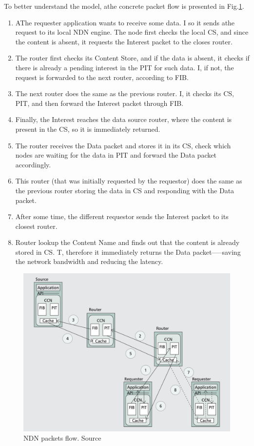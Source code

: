 To better understand the model, athe concrete packet flow is presented in Fig.\ref{fig:ndn-flow}. 
\begin{enumerate}
    \item AThe requester application wants to receive some data. I so it sends athe request to its local NDN engine. The node first checks the local CS, and since the content is absent, it requests the Interest packet to the closes router.
    \item The router first checks its Content Store, and if the data is absent, it checks if there is already a pending interest in the PIT for such data. I, if not, the request is forwarded to the next router, according to FIB.  
    \item The next router does the same as the previous router. I, it checks its CS, PIT, and then forward the Interest packet through FIB.
    \item Finally, the Interest reaches the data source router, where the content is present in the CS, so it is immediately returned.
    \item The router receives the Data packet and stores it in its CS, check which nodes are waiting for the data in PIT and forward the Data packet accordingly.
    \item This router (that was initially requested by the requestor) does the same as the previous router storing the data in CS and responding with the Data packet.
    \item After some time, the different requestor sends the Interest packet to its closest router.
    \item Router lookup the Content Name and finds out that the content is already stored in CS. T, therefore it immediately returns the Data packet–––saving the network bandwidth and reducing the latency.
\end{enumerate}

\begin{figure}[h]
    \centering
    \includegraphics[width=\linewidth]{img/ndn-flow.png}
    \caption{NDN packets flow. Source \cite{ahlgren2012survey}}
    \label{fig:ndn-flow}
\end{figure}

